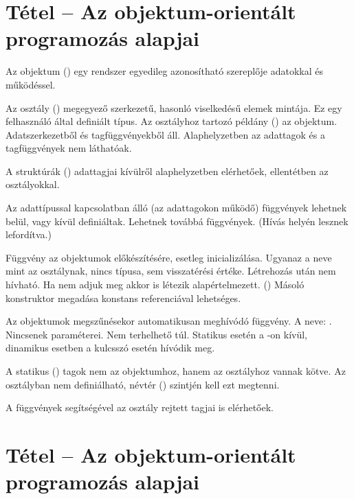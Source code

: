 \documentclass[main.tex]{subfiles}
\begin{document}
  \section{Tétel – Az objektum-orientált programozás alapjai} %

  Az objektum () egy rendszer egyedileg
  azonosítható szereplője adatokkal és működéssel.
  

  Az osztály () megegyező szerkezetű,
  hasonló viselkedésű elemek mintája.
  Ez egy felhasználó által definiált típus.
  Az osztályhoz tartozó példány () az objektum.
  Adatszerkezetből és tagfüggvényekből áll.
  Alaphelyzetben az adattagok és a tagfüggvények
  nem láthatóak.


  A struktúrák () adattagjai kívülről
  alaphelyzetben elérhetőek, ellentétben az osztályokkal.


  Az adattípussal kapcsolatban álló (az adattagokon működő)
  függvények lehetnek belül, vagy kívül definiáltak.
  Lehetnek továbbá  függvények.
  (Hívás helyén lesznek lefordítva.)


  Függvény az objektumok előkészítésére, esetleg inicializálása.
  Ugyanaz a neve mint az osztálynak, nincs típusa,
  sem visszatérési értéke. Létrehozás után nem hívható.
  Ha nem adjuk meg akkor is létezik alapértelmezett. ()
  Másoló konstruktor megadása konstans referenciával lehetséges.


  Az objektumok megszűnésekor automatikusan meghívódó függvény.
  A neve: . Nincsenek paraméterei.
  Nem terhelhető túl. Statikus  esetén a
  -on kívül, dinamikus esetben a 
  kulcsszó esetén hívódik meg.


  A statikus () tagok nem az objektumhoz,
  hanem az osztályhoz vannak kötve. Az osztályban nem definiálható,
  névtér () szintjén kell ezt megtenni.


  A  függvények segítségével az osztály rejtett tagjai
  is elérhetőek.


  
  \pagebreak
  \section{Tétel – Az objektum-orientált programozás alapjai} %
\end{document}
